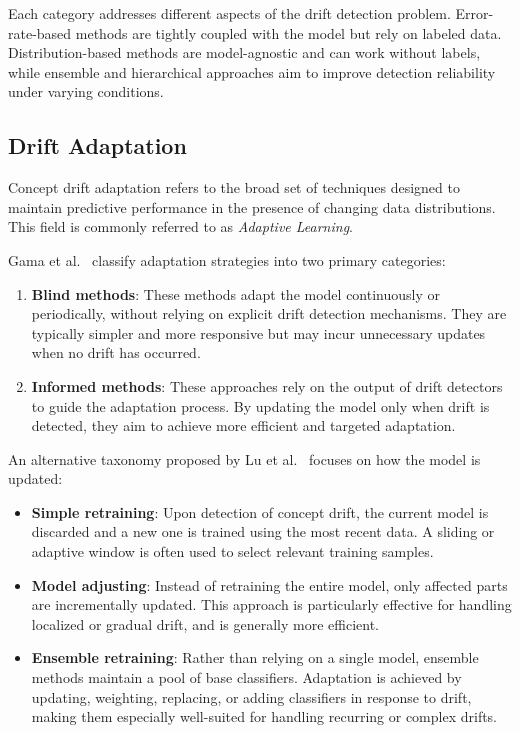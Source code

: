Each category addresses different aspects of the drift detection problem.
Error-rate-based methods are tightly coupled with the model but rely on labeled
data. Distribution-based methods are model-agnostic and can work without
labels, while ensemble and hierarchical approaches aim to improve detection
reliability under varying conditions.

\subsection*{Drift Adaptation}\label{subsec:drift_adaption}

Concept drift adaptation refers to the broad set of techniques designed to
maintain predictive performance in the presence of changing data distributions.
This field is commonly referred to as \emph{Adaptive Learning}.

Gama et al.~\cite{drift_adaptation_survey} classify adaptation strategies into
two primary categories:

\begin{enumerate}
    \item \textbf{Blind methods}: These methods adapt the model continuously or
          periodically, without relying on explicit drift detection mechanisms.
          They are typically simpler and more responsive but may incur unnecessary
          updates when no drift has occurred.
    \item \textbf{Informed methods}: These approaches rely on the output of drift
          detectors to guide the adaptation process. By updating the model only when drift
          is detected, they aim to achieve more efficient and targeted adaptation.
\end{enumerate}

An alternative taxonomy proposed by Lu et
al.~\cite{learning_under_concept_drift} focuses on how the model is updated:

\begin{itemize}
    \item \textbf{Simple retraining}: Upon detection of concept drift, the
          current model is discarded and a new one is trained using the most recent
          data. A sliding or adaptive window is often used to select relevant training
          samples.
    \item \textbf{Model adjusting}: Instead of retraining the entire model,
          only affected parts are incrementally updated. This approach is particularly
          effective for handling localized or gradual drift, and is generally more
          efficient.
    \item \textbf{Ensemble retraining}: Rather than relying on a single model,
          ensemble methods maintain a pool of base classifiers. Adaptation is achieved
          by updating, weighting, replacing, or adding classifiers in response to drift,
          making them especially well-suited for handling recurring or complex drifts.
\end{itemize}

